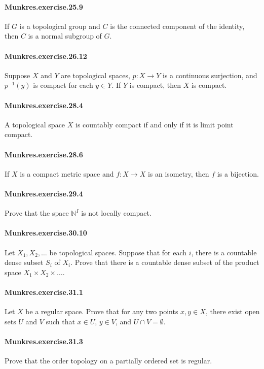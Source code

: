 \documentclass{article}
\begin{document}
\paragraph{Munkres.exercise.25.9} If $G$ is a topological group and $C$ is the connected component of the identity, then $C$ is a normal subgroup of $G$.

\paragraph{Munkres.exercise.26.12} Suppose $X$ and $Y$ are topological spaces, $p:X\to Y$ is a continuous surjection, and $p^{-1}(y)$ is compact for each $y\in Y$. If $Y$ is compact, then $X$ is compact.

\paragraph{Munkres.exercise.28.4} A topological space $X$ is countably compact if and only if it is limit point compact.

\paragraph{Munkres.exercise.28.6} If $X$ is a compact metric space and $f:X\to X$ is an isometry, then $f$ is a bijection.

\paragraph{Munkres.exercise.29.4} Prove that the space $\mathbb{N}^I$ is not locally compact.

\paragraph{Munkres.exercise.30.10} Let $X_1, X_2, \dots$ be topological spaces. Suppose that for each $i$, there is a countable dense subset $S_i$ of $X_i$. Prove that there is a countable dense subset of the product space $X_1\times X_2\times \dots$.

\paragraph{Munkres.exercise.31.1} Let $X$ be a regular space. Prove that for any two points $x, y \in X$, there exist open sets $U$ and $V$ such that $x \in U$, $y \in V$, and $U \cap V = \emptyset$.

\paragraph{Munkres.exercise.31.3} Prove that the order topology on a partially ordered set is regular.
\end{document}
